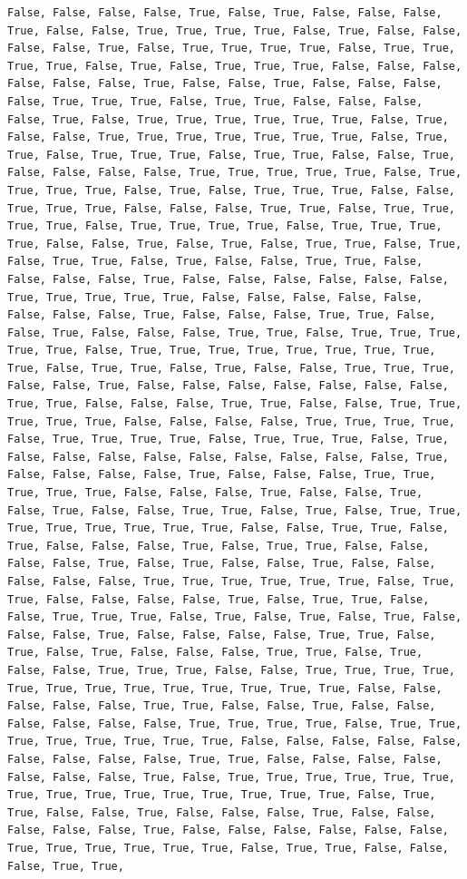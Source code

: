 \documentclass[
  letterpaper,
  DIV=11,
  numbers=noendperiod]{scrartcl}
\begin{document}
\begin{verbatim}
False, False, False, False, True, False, True, False, False, False, True, False, False, True, True, True, True, False, True, False, False, False, False, True, False, True, True, True, True, False, True, True, True, True, False, True, False, True, True, True, False, False, False, False, False, False, True, False, False, True, False, False, False, False, True, True, True, False, True, True, False, False, False, False, True, False, True, True, True, True, True, True, False, True, False, False, True, True, True, True, True, True, True, False, True, True, False, True, True, True, False, True, True, False, False, True, False, False, False, False, True, True, True, True, True, False, True, True, True, True, False, True, False, True, True, True, False, False, True, True, True, False, False, False, True, True, False, True, True, True, True, False, True, True, True, True, False, True, True, True, True, False, False, True, False, True, False, True, True, False, True, False, True, True, False, True, False, False, True, True, False, False, False, False, True, False, False, False, False, False, False, True, True, True, True, True, False, False, False, False, False, False, False, False, True, False, False, False, True, True, False, False, True, False, False, False, True, True, False, True, True, True, True, True, False, True, True, True, True, True, True, True, True, True, False, True, True, False, True, False, False, True, True, True, False, False, True, False, False, False, False, False, False, False, True, True, False, False, False, True, True, False, False, True, True, True, True, True, False, False, False, False, True, True, True, True, False, True, True, True, True, False, True, True, True, False, True, False, False, False, False, False, False, False, False, False, True, False, False, False, False, True, False, False, False, True, True, True, True, True, False, False, False, True, False, False, True, False, True, False, False, True, True, False, True, False, True, True, True, True, True, True, True, True, False, False, True, True, False, True, False, False, False, True, False, True, True, False, False, False, False, True, False, True, False, False, True, False, False, False, False, False, True, True, True, True, True, True, False, True, True, False, False, False, False, True, False, True, True, False, False, True, True, True, False, True, False, True, False, True, False, False, False, True, False, False, False, False, True, True, False, True, False, True, False, False, False, True, True, False, True, False, False, True, True, True, False, False, True, True, True, True, True, True, True, True, True, True, True, True, True, False, False, False, False, False, True, True, False, False, True, False, False, False, False, False, False, True, True, True, True, False, True, True, True, True, True, True, True, True, False, False, False, False, False, False, False, False, False, True, True, False, False, False, False, False, False, False, True, False, True, True, True, True, True, True, True, True, True, True, True, True, True, True, True, False, True, True, False, False, True, False, False, False, True, False, False, False, False, False, True, False, False, False, False, False, False, True, True, True, True, True, True, False, True, True, False, False, False, True, True, 
\end{verbatim}
\end{document}
